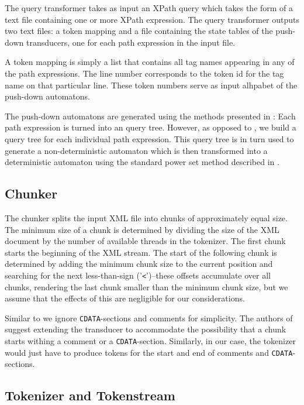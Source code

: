 The query transformer takes as input an XPath query which takes the form of a
text file containing one or more XPath expression. The query transformer outputs
two text files: a token mapping and a file containing the state tables of
the push-down transducers, one for each path expression in the input file.

A token mapping is simply a list that contains all tag names appearing in any
of the path expressions. The line number corresponds to the token id for the
tag name on that particular line. These token numbers serve as input alhpabet
of the push-down automatons.

The push-down automatons are generated using the methods presented in : Each path expression is turned into an query tree. However,
as opposed to , we build a query tree for each
individual path expression. This query tree is in turn used to generate a
non-deterministic automaton which is then transformed into a deterministic
automaton using the standard power set method described in .

\subsection{Chunker}

The chunker splits the input XML file into chunks of approximately equal size.
The minimum size of a chunk is determined by dividing the size of the XML
document by the number of available threads in the tokenizer. The first chunk
starts the beginning of the XML stream. The start of the following chunk is
determined by adding the minimum chunk size to the current position and
searching for the next less-than-sign ('\texttt{<}')–these offsets accumulate over
all chunks, rendering the last chunk smaller than the minimum chunk size, but we
assume that the effects of this are negligible for our considerations.

Similar to  we ignore \texttt{CDATA}-sections and comments for
simplicity. The authors of  suggest extending the transducer to
accommodate the possibility that a chunk starts withing a comment or a
\texttt{CDATA}-section. Similarly, in our case, the tokenizer would just have to
produce tokens for the start and end of comments and \texttt{CDATA}-sections.

\subsection{Tokenizer and Tokenstream}

